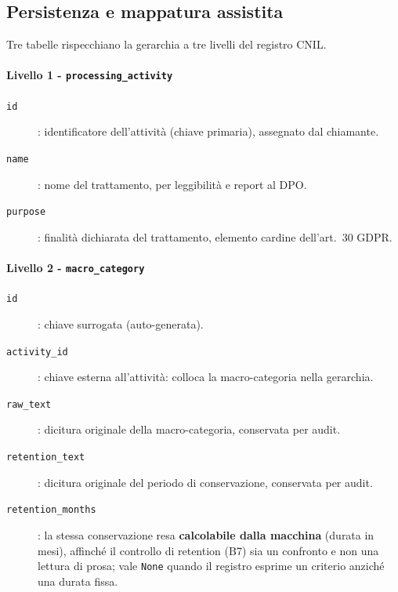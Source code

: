 \subsection{Persistenza e mappatura assistita}
\label{sub:impl-b1-mappatura}

Tre tabelle rispecchiano la gerarchia a tre livelli del registro CNIL.

\paragraph*{Livello 1 - \texttt{processing\_activity}}
\begin{description}
	\item[\texttt{id}]: identificatore dell'attività (chiave primaria), assegnato dal chiamante.
	\item[\texttt{name}]: nome del trattamento, per leggibilità e report al DPO.
	\item[\texttt{purpose}]: finalità dichiarata del trattamento, elemento cardine dell'art.~30 GDPR.
\end{description}

\paragraph*{Livello 2 - \texttt{macro\_category}}
\begin{description}
	\item[\texttt{id}]: chiave surrogata (auto-generata).
	\item[\texttt{activity\_id}]: chiave esterna all'attività: colloca la macro-categoria nella gerarchia.
	\item[\texttt{raw\_text}]: dicitura originale della macro-categoria, conservata per audit.
	\item[\texttt{retention\_text}]: dicitura originale del periodo di conservazione, conservata per audit.
	\item[\texttt{retention\_months}]: la stessa conservazione resa \textbf{calcolabile dalla macchina} (durata in mesi), affinché il controllo di retention (B7) sia un confronto e non una lettura di prosa; vale \texttt{None} quando il registro esprime un criterio anziché una durata fissa.
\end{description}

